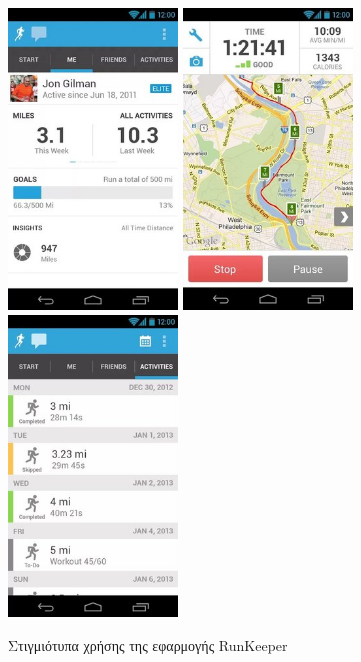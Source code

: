 \documentclass[12pt,twoside,openright]{report}
\begin{document}
\begin{figure}[H]
\includegraphics[height=8cm]{images/rk1}
\hspace{0.4in}
\includegraphics[height=8cm]{images/rk2}
\hspace{0.4in}
\includegraphics[height=8cm]{images/rk3}
\caption{Στιγμιότυπα χρήσης της εφαρμογής \lt RunKeeper \gt}
\end{figure}
\end{document}
